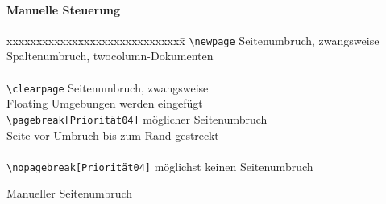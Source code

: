 \paragraph{Manuelle Steuerung}\leavevmode
\begin{table}[H]
\begin{tabbing}
xxxxxxxxxxxxxxxxxxxxxxxxxxxxxx\=\kill
\verb=\newpage=					\>Seitenumbruch, zwangsweise\\
								\>Spaltenumbruch, twocolumn-Dokumenten\\
\\
\verb=\clearpage=					\>Seitenumbruch, zwangsweise\\
								\>Floating Umgebungen werden eingefügt\\
\verb=\pagebreak[Priorität04]=			\>möglicher Seitenumbruch\\
								\>Seite vor Umbruch bis zum Rand gestreckt\\
\\
\verb=\nopagebreak[Priorität04]=			\>möglichst keinen Seitenumbruch\\
\end{tabbing}
\caption{Manueller Seitenumbruch}
\end{table}